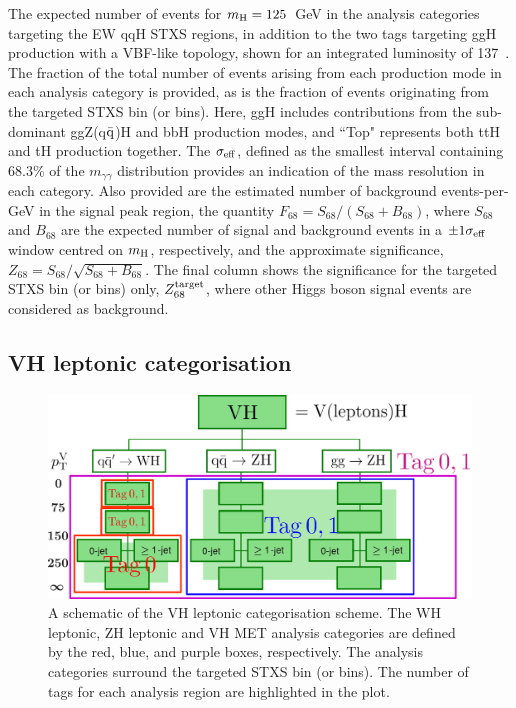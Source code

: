 \begin{table}
    \caption[Expected yields for the qqH production mode categories]{The expected number of events for $m_{\rm{H}}=125$~GeV in the analysis categories targeting the EW qqH STXS regions, in addition to the two tags targeting ggH production with a VBF-like topology, shown for an integrated luminosity of 137~\fbinv. The fraction of the total number of events arising from each production mode in each analysis category is provided, as is the fraction of events originating from the targeted STXS bin (or bins). Here, ggH includes contributions from the sub-dominant ggZ(q$\bar{\rm{q}}$)H and bbH production modes, and ``Top" represents both ttH and tH production together. The $\sigma_{\rm{eff}}$, defined as the smallest interval containing 68.3\% of the $m_{\gamma\gamma}$ distribution provides an indication of the mass resolution in each category. Also provided are the estimated number of background events-per-GeV in the signal peak region, the quantity $F_{68}=S_{68}/(S_{68}+B_{68})$, where $S_{68}$ and $B_{68}$ are the expected number of signal and background events in a $\pm1\sigma_{\rm{eff}}$ window centred on $m_{\rm{H}}$, respectively, and the approximate significance, $Z_{68}=S_{68}/\sqrt{S_{68}+B_{68}}$. The final column shows the significance for the targeted STXS bin (or bins) only, $Z^{\rm{target}}_{68}$,  where other Higgs boson signal events are considered as background.}
    \label{tab:qqH_category_yields}
    \centering
    \scriptsize
    \renewcommand{\arraystretch}{1.1}
    \setlength{\tabcolsep}{3pt}
    \hspace*{-5cm}
    
    \hspace*{-5cm}
\end{table}

\subsection{VH leptonic categorisation}
\begin{figure}
  \centering
  \includegraphics[width=.8\textwidth]{Figures/hgg_overview/categorisation_schematics/VHlepCategorisation.pdf}
  \caption[VH leptonic categorisation schematic]
  {
    A schematic of the VH leptonic categorisation scheme. The WH leptonic, ZH leptonic and VH MET analysis categories are defined by the red, blue, and purple boxes, respectively. The analysis categories surround the targeted STXS bin (or bins). The number of tags for each analysis region are highlighted in the plot.
  }
  \label{fig:VHlep_categorisation_schematic}
\end{figure}

